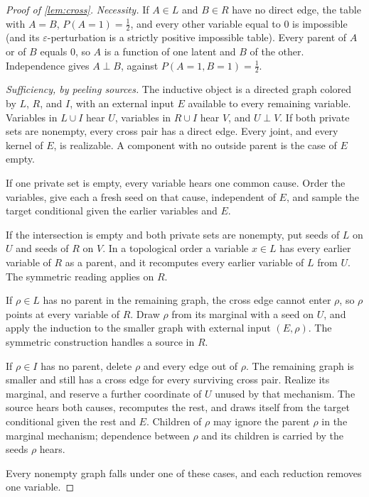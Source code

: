 \begin{proof}[Proof of \cref{lem:cross}]
\emph{Necessity.} If $A\in L$ and $B\in R$ have no direct edge, the table with $A=B$, $P(A{=}1)=\tfrac12$, and every other variable equal to $0$ is impossible (and its $\varepsilon$-perturbation is a strictly positive impossible table). Every parent of $A$ or of $B$ equals $0$, so $A$ is a function of one latent and $B$ of the other. Independence gives $A\perp B$, against $P(A{=}1,B{=}1)=\tfrac12$.

\emph{Sufficiency, by peeling sources.} The inductive object is a directed graph colored by $L$, $R$, and $I$, with an external input $E$ available to every remaining variable. Variables in $L\cup I$ hear $U$, variables in $R\cup I$ hear $V$, and $U\perp V$. If both private sets are nonempty, every cross pair has a direct edge. Every joint, and every kernel of $E$, is realizable. A component with no outside parent is the case of $E$ empty.

If one private set is empty, every variable hears one common cause. Order the variables, give each a fresh seed on that cause, independent of $E$, and sample the target conditional given the earlier variables and $E$.

If the intersection is empty and both private sets are nonempty, put seeds of $L$ on $U$ and seeds of $R$ on $V$. In a topological order a variable $x\in L$ has every earlier variable of $R$ as a parent, and it recomputes every earlier variable of $L$ from $U$. The symmetric reading applies on $R$.

If $\rho\in L$ has no parent in the remaining graph, the cross edge cannot enter $\rho$, so $\rho$ points at every variable of $R$. Draw $\rho$ from its marginal with a seed on $U$, and apply the induction to the smaller graph with external input $(E,\rho)$. The symmetric construction handles a source in $R$.

If $\rho\in I$ has no parent, delete $\rho$ and every edge out of $\rho$. The remaining graph is smaller and still has a cross edge for every surviving cross pair. Realize its marginal, and reserve a further coordinate of $U$ unused by that mechanism. The source hears both causes, recomputes the rest, and draws itself from the target conditional given the rest and $E$. Children of $\rho$ may ignore the parent $\rho$ in the marginal mechanism; dependence between $\rho$ and its children is carried by the seeds $\rho$ hears.

Every nonempty graph falls under one of these cases, and each reduction removes one variable.
\end{proof}

